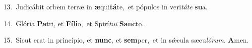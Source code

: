 {\numbfont\textcolor{\numbcolor}{13.}}~Judicábit orbem terræ in \textbf{æ}\-qui\-\textbf{tá}\-te,~\star et pópulos in veri\-\textit{tá}\-\textit{te} \textbf{su}\-a.\par
{\numbfont\textcolor{\numbcolor}{14.}}~Glória \textbf{Pa}\-tri, et \textbf{Fí}\-\textbf{li}o,~\star et Spirí\-\textit{tu}\-\textit{i} \textbf{Sanc}\-to.\par
{\numbfont\textcolor{\numbcolor}{15.}}~Sicut erat in princípio, et \textbf{nunc}\-, et \textbf{sem}\-per,~\star et in sǽcula sæcu\-\textit{ló}\-\textit{rum}. \textbf{A}\-men.\par
